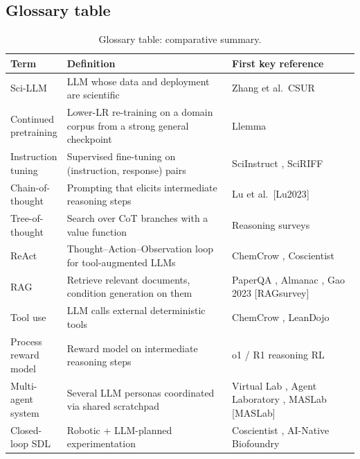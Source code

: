 \documentclass{article}
\begin{document}
\subsection{Glossary table}\label{glossary-table}

\begin{table}[t]
\centering
\caption{Glossary table: comparative summary.}
\label{tab:glossary-table}
\begin{tabular}{>{\raggedright\arraybackslash}p{0.1467\linewidth}
  >{\raggedright\arraybackslash}p{0.4800\linewidth}
  >{\raggedright\arraybackslash}p{0.3733\linewidth}}
\toprule
Term & Definition & First key reference \\
\midrule
Sci-LLM & LLM whose data and deployment are scientific & Zhang et al.~CSUR \cite{zhang2025scientificlargelan} \\
Continued pretraining & Lower-LR re-training on a domain corpus from a strong general checkpoint & Llemma \cite{azerbayev2023llemmaanopenlangua} \\
Instruction tuning & Supervised fine-tuning on (instruction, response) pairs & SciInstruct \cite{zhang2024sciinstructaselfre}, SciRIFF \cite{wadden2024sciriffaresourceto} \\
Chain-of-thought & Prompting that elicits intermediate reasoning steps & Lu et al.~{[}Lu2023{]} \\
Tree-of-thought & Search over CoT branches with a value function & Reasoning surveys \cite{zhao2026appliedandcomputat} \\
ReAct & Thought--Action--Observation loop for tool-augmented LLMs & ChemCrow \cite{bran2024naturemachineintel}, Coscientist \cite{boiko2023nature6242023} \\
RAG & Retrieve relevant documents, condition generation on them & PaperQA \cite{ala2023arxiv2312075592023}, Almanac \cite{zakka2024almanacretrievalau}, Gao 2023 {[}RAGsurvey{]} \\
Tool use & LLM calls external deterministic tools & ChemCrow \cite{bran2024naturemachineintel}, LeanDojo \cite{yang2023leandojotheorempro} \\
Process reward model & Reward model on intermediate reasoning steps & o1 / R1 reasoning RL \\
Multi-agent system & Several LLM personas coordinated via shared scratchpad & Virtual Lab \cite{swanson2024thevirtuallabaiage}, Agent Laboratory \cite{schmidgall2025agentlaboratoryusi}, MASLab {[}MASLab{]} \\
Closed-loop SDL & Robotic + LLM-planned experimentation & Coscientist \cite{boiko2023nature6242023}, AI-Native Biofoundry \cite{zhang2026anainativebiofound} \\

\end{tabular}
\end{table}
\end{document}
